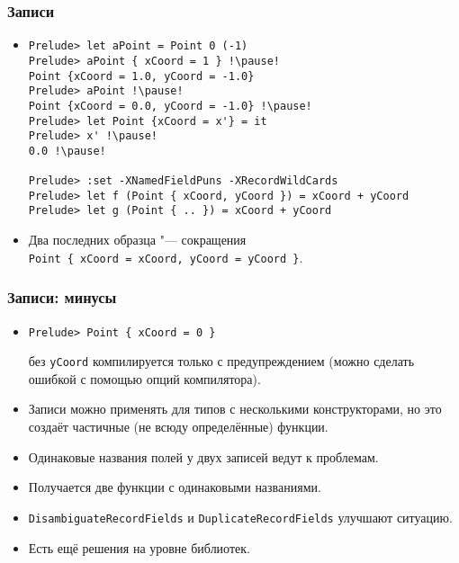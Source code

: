\documentclass[10pt]{beamer}
\begin{document}
\begin{frame}[fragile]
\frametitle{Записи}\hypertarget{rec2}{}
\hyperlink{rec1}{}
\begin{itemize}
\item 
\begin{lstlisting}[basicstyle=\ttfamily\small]
Prelude> let aPoint = Point 0 (-1)
Prelude> aPoint { xCoord = 1 } !\pause!
Point {xCoord = 1.0, yCoord = -1.0}
Prelude> aPoint !\pause!
Point {xCoord = 0.0, yCoord = -1.0} !\pause!
Prelude> let Point {xCoord = x'} = it
Prelude> x' !\pause!
0.0 !\pause!

Prelude> :set -XNamedFieldPuns -XRecordWildCards
Prelude> let f (Point { xCoord, yCoord }) = xCoord + yCoord
Prelude> let g (Point { .. }) = xCoord + yCoord
\end{lstlisting}
\item Два последних образца "--- сокращения\\ \lstinline[basicstyle=\ttfamily\small]|Point { xCoord = xCoord, yCoord = yCoord }|.
\end{itemize}

\end{frame}

\begin{frame}[fragile]
\frametitle{Записи: минусы}\hypertarget{rec2}{}
\hyperlink{rec1}{}
\begin{itemize}
    \item
\begin{lstlisting}
Prelude> Point { xCoord = 0 }
\end{lstlisting}
    \pause
    без \lstinline|yCoord| компилируется только с предупреждением (можно сделать ошибкой с помощью опций компилятора).
    \pause 
    \item Записи можно применять для типов с несколькими конструкторами, но это создаёт частичные (не всюду определённые) функции.
    \pause
    \item Одинаковые названия полей у двух записей ведут к проблемам. 
    \pause
    \item Получается две функции с одинаковыми названиями.
    \item \lstinline|DisambiguateRecordFields| и \lstinline|DuplicateRecordFields| улучшают ситуацию.
    \pause
    \item Есть ещё решения на уровне библиотек.
\end{itemize}
\end{frame}
\end{document}

